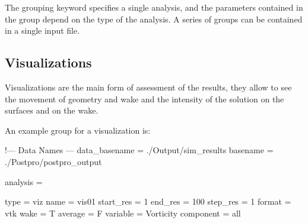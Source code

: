 The grouping keyword   specifies a single analysis, and the parameters contained in the group depend on the type of the analysis. A series of   groups can be contained in a single input file.

\subsection{Visualizations}

Visualizations are the main form of assessment of the results, they allow to see the movement of geometry and wake and the intensity of the solution on the surfaces and on the wake.

An example  group for a visualization is:

\begin{inputfile}[frame=single, caption={dust\_post.in for visualization}, label={file:dust_post.in_viz}]
!--- Data Names ---
data_basename = ./Output/sim_results
basename =     ./Postpro/postpro_output

analysis = {

type = viz  
name = vis01
start_res = 1
end_res   = 100 
step_res  = 1
format = vtk
wake = T
average = F
variable = Vorticity 
component = all

}
\end{inputfile}

